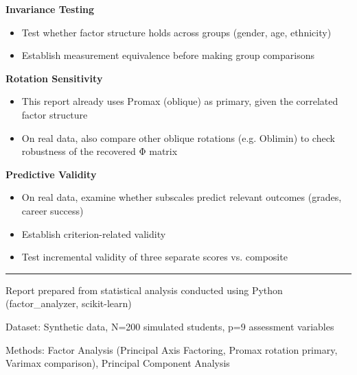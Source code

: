 \documentclass[
]{article}
\begin{document}
\textbf{Invariance Testing}

\begin{itemize}
\item
  Test whether factor structure holds across groups (gender, age,
  ethnicity)
\item
  Establish measurement equivalence before making group comparisons
\end{itemize}

\textbf{Rotation Sensitivity}

\begin{itemize}
\item
  This report already uses Promax (oblique) as primary, given the
  correlated factor structure
\item
  On real data, also compare other oblique rotations (e.g. Oblimin) to
  check robustness of the recovered Φ matrix
\end{itemize}

\textbf{Predictive Validity}

\begin{itemize}
\item
  On real data, examine whether subscales predict relevant outcomes
  (grades, career success)
\item
  Establish criterion-related validity
\item
  Test incremental validity of three separate scores vs. composite
\end{itemize}

\begin{center}\rule{0.5\linewidth}{0.5pt}\end{center}

Report prepared from statistical analysis conducted using Python
(factor\_analyzer, scikit-learn)

Dataset: Synthetic data, N=200 simulated students, p=9 assessment
variables

Methods: Factor Analysis (Principal Axis Factoring, Promax rotation
primary, Varimax comparison), Principal Component Analysis
\end{document}
